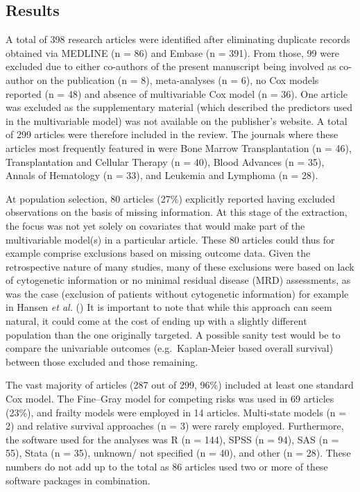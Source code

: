 \documentclass[
  letterpaper,
  DIV=11,
  numbers=noendperiod]{scrreprt}
\begin{document}
\subsection{Results}\label{results}

A total of 398 research articles were identified after eliminating
duplicate records obtained via MEDLINE (n = 86) and Embase (n = 391).
From those, 99 were excluded due to either co-authors of the present
manuscript being involved as co-author on the publication (n = 8),
meta-analyses (n = 6), no Cox models reported (n = 48) and absence of
multivariable Cox model (n = 36). One article was excluded as the
supplementary material (which described the predictors used in the
multivariable model) was not available on the publisher's website. A
total of 299 articles were therefore included in the review. The
journals where these articles most frequently featured in were Bone
Marrow Transplantation (n = 46), Transplantation and Cellular Therapy (n
= 40), Blood Advances (n = 35), Annals of Hematology (n = 33), and
Leukemia and Lymphoma (n = 28).

At population selection, 80 articles (27\%) explicitly reported having
excluded observations on the basis of missing information. At this stage
of the extraction, the focus was not yet solely on covariates that would
make part of the multivariable model(s) in a particular article. These
80 articles could thus for example comprise exclusions based on missing
outcome data. Given the retrospective nature of many studies, many of
these exclusions were based on lack of cytogenetic information or no
minimal residual disease (MRD) assessments, as was the case (exclusion
of patients without cytogenetic information) for example in Hansen
\emph{et al.} () It is
important to note that while this approach can seem natural, it could
come at the cost of ending up with a slightly different population than
the one originally targeted. A possible sanity test would be to compare
the univariable outcomes (e.g.~Kaplan-Meier based overall survival)
between those excluded and those remaining.

The vast majority of articles (287 out of 299, 96\%) included at least
one standard Cox model. The Fine--Gray model for competing risks was
used in 69 articles (23\%), and frailty models were employed in 14
articles. Multi-state models (n = 2) and relative survival approaches (n
= 3) were rarely employed. Furthermore, the software used for the
analyses was R (n = 144), SPSS (n = 94), SAS (n = 55), Stata (n = 35),
unknown/ not specified (n = 40), and other (n = 28). These numbers do
not add up to the total as 86 articles used two or more of these
software packages in combination.
\end{document}
